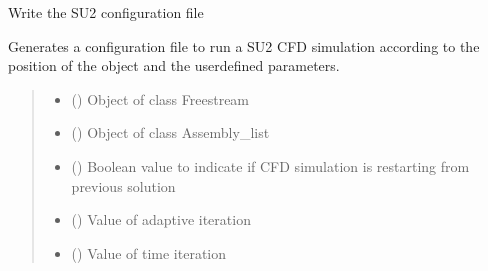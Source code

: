 \documentclass[letterpaper,10pt,english]{sphinxmanual}
\begin{document}
\begin{fulllineitems}
\label{\detokenize{modules:su2.write_SU2_config}}
\pysigstartsignatures
{}
\pysigstopsignatures
\sphinxAtStartPar
Write the SU2 configuration file

\sphinxAtStartPar
Generates a configuration file to run a SU2 CFD simulation according to the position of the object and the user\sphinxhyphen{}defined parameters.
\begin{quote}\begin{description}
\begin{itemize}
\item {} 
\sphinxAtStartPar
{} ({\hyperref[\detokenize{modules:configuration.Freestream}]{}}) \textendash{} Object of class Freestream

\item {} 
\sphinxAtStartPar
{} ({\hyperref[\detokenize{modules:assembly.Assembly_list}]{}}) \textendash{} Object of class Assembly\_list

\item {} 
\sphinxAtStartPar
{} () \textendash{} Boolean value to indicate if CFD simulation is restarting from previous solution

\item {} 
\sphinxAtStartPar
{} () \textendash{} Value of adaptive iteration

\item {} 
\sphinxAtStartPar
{} () \textendash{} Value of time iteration


\end{itemize}
\end{description}
\end{quote}
\end{fulllineitems}
\end{document}
